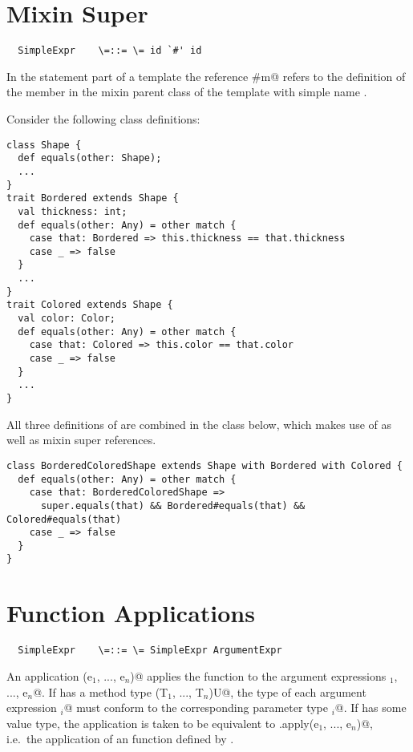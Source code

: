 \documentclass[11pt]{report}
\begin{document}
\section{Mixin Super}
\label{sec:this-mxin-super}

\syntax\begin{verbatim}
  SimpleExpr    \=::= \= id `#' id
\end{verbatim}

In the statement part of a template
the reference \verb@M#m@ refers to the definition of the member \verb@m@ in
the mixin parent class of the template with simple name \verb@M@.

\example Consider the following class definitions:
\begin{verbatim}
class Shape {
  def equals(other: Shape);
  ...
}
trait Bordered extends Shape {
  val thickness: int;
  def equals(other: Any) = other match {
    case that: Bordered => this.thickness == that.thickness
    case _ => false
  }
  ...
}
trait Colored extends Shape {
  val color: Color;
  def equals(other: Any) = other match {
    case that: Colored => this.color == that.color
    case _ => false
  }
  ...
}
\end{verbatim}

All three definitions of \verb@equals@ are combined in the class
below, which makes use of \verb@super@ as well as mixin
super references.
\begin{verbatim}
class BorderedColoredShape extends Shape with Bordered with Colored {
  def equals(other: Any) = other match {
    case that: BorderedColoredShape => 
      super.equals(that) && Bordered#equals(that) && Colored#equals(that)
    case _ => false
  }
}
\end{verbatim}

\section{Function Applications}
\label{sec:apply}

\syntax\begin{verbatim}
  SimpleExpr    \=::= \= SimpleExpr ArgumentExpr
\end{verbatim}

An application \verb@f(e$_1$, ..., e$_n$)@ applies the function \verb@f@ to the
argument expressions \verb@e$_1$, ..., e$_n$@. If \verb@f@ has a method type
\verb@(T$_1$, ..., T$_n$)U@, the type of each argument
expression \verb@e$_i$@ must conform to the corresponding parameter type
\verb@T$_i$@. If \verb@f@ has some value type, the application is taken to be
equivalent to \verb@f.apply(e$_1$, ..., e$_n$)@, i.e.\ the
application of an \verb@apply@ function defined by \verb@f@.
\end{document}

